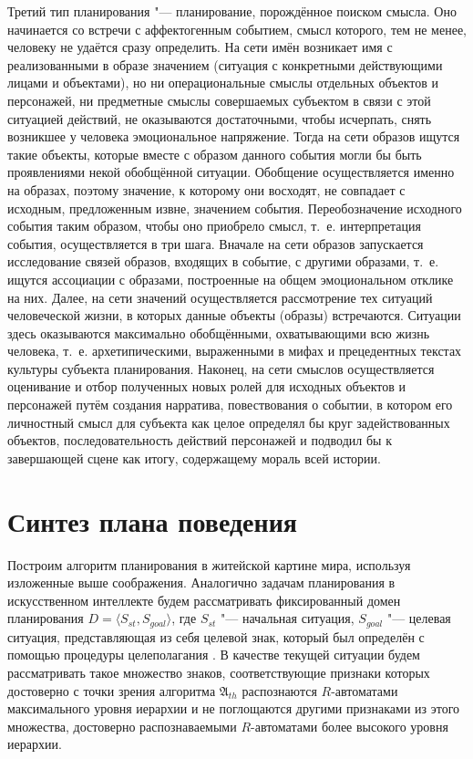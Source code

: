 \documentclass[a4paper, 12pt]{article}
\theoremstyle{plain}
\begin{document}
	Третий тип планирования "--- планирование, порождённое поиском смысла. Оно начинается со встречи с аффектогенным событием, смысл которого, тем не менее, человеку не удаётся сразу определить. На сети имён возникает имя с реализованными в образе значением (ситуация с конкретными действующими лицами и объектами), но ни операциональные смыслы отдельных объектов и персонажей, ни предметные смыслы совершаемых субъектом в связи с этой ситуацией действий, не оказываются достаточными, чтобы исчерпать, снять возникшее у человека эмоциональное напряжение. Тогда на сети образов ищутся такие объекты, которые вместе с образом данного события могли бы быть проявлениями некой обобщённой ситуации. Обобщение осуществляется именно на образах, поэтому значение, к которому они восходят, не совпадает с исходным, предложенным извне, значением события. Переобозначение исходного события таким образом, чтобы оно приобрело смысл, т.~е. интерпретация события, осуществляется в три шага. Вначале на сети образов запускается исследование связей образов, входящих в событие, с другими образами, т.~е. ищутся ассоциации с образами, построенные на общем эмоциональном отклике на них. Далее, на сети значений осуществляется рассмотрение тех ситуаций человеческой жизни, в которых данные объекты (образы) встречаются. Ситуации здесь оказываются максимально обобщёнными, охватывающими всю жизнь человека, т.~е. архетипическими, выраженными в мифах и прецедентных текстах культуры субъекта планирования. Наконец, на сети смыслов осуществляется оценивание и отбор полученных новых ролей для исходных объектов и персонажей путём создания нарратива, повествования о событии, в котором его личностный смысл для субъекта как целое определял бы круг задействованных объектов, последовательность действий персонажей и подводил бы к завершающей сцене как итогу, содержащему мораль всей истории.

	\section{Синтез плана поведения} \label{sect:plan}
	Построим алгоритм планирования в житейской картине мира, используя изложенные выше соображения. Аналогично задачам планирования в искусственном интеллекте \cite{Fikes1971} будем рассматривать фиксированный домен планирования $D=\langle S_{st},S_{goal} \rangle$, где $S_{st}$ "--- начальная ситуация, $S_{goal}$ "--- целевая ситуация, представляющая из себя целевой знак, который был определён с помощью процедуры целеполагания \cite{PanovA2014a}. В качестве текущей ситуации будем рассматривать такое множество знаков, соответствующие признаки которых достоверно с точки зрения алгоритма $\mathfrak A_{th}$ распознаются $R$-автоматами максимального уровня иерархии и не поглощаются другими признаками из этого множества, достоверно распознаваемыми $R$-автоматами более высокого уровня иерархии.
	
\end{document}
